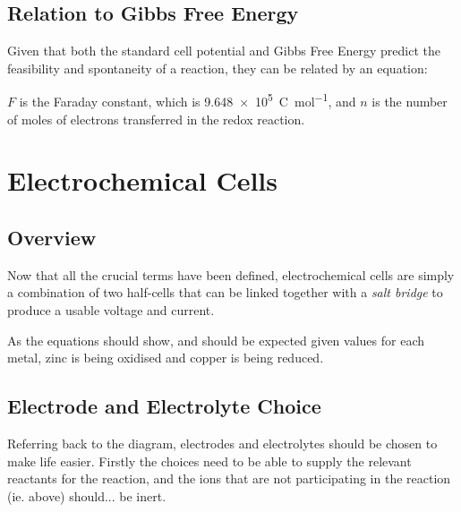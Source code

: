

		\subsection{Relation to Gibbs Free Energy}

			Given that both the standard cell potential and Gibbs Free Energy predict the feasibility and spontaneity of a reaction, they can
			be related by an equation:



			$F$ is the Faraday constant, which is \SI{9.648e5}{\coulomb\per\mole}, and $n$ is the number of moles of electrons transferred in the
			redox reaction.






	\pagebreak
	\section{Electrochemical Cells}

		\subsection{Overview}

			Now that all the crucial terms have been defined, electrochemical cells are simply a combination of two half-cells that can be
			linked together with a \textit{salt bridge} to produce a usable voltage and current.


			As the equations should show, and should be expected given \Eo{} values for each metal, zinc is being oxidised and copper is being
			reduced.



		\subsection{Electrode and Electrolyte Choice}

			Referring back to the diagram, electrodes and electrolytes should be chosen to make life easier. Firstly the choices need to be
			able to supply the relevant reactants for the reaction, and the ions that are not participating in the reaction (ie.  above)
			should... be inert.

